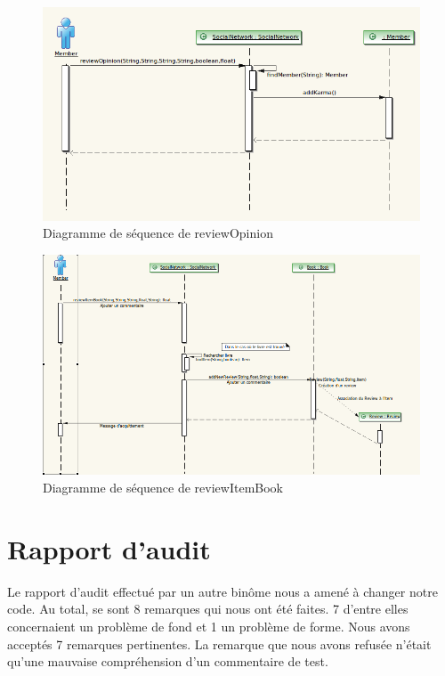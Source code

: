 \documentclass[12pt,a4paper]{report}
\begin{document}
\begin{figure}[h]
\centering
\includegraphics[angle = 90, scale=0.85]{Sequence1.png}
\caption{Diagramme de séquence de reviewOpinion}
\label{fig:diagSeq1}
\end{figure}


\begin{figure}[h]
\centering
\includegraphics[angle = 90, scale=0.85]{Sequence2.png}
\caption{Diagramme de séquence de reviewItemBook}
\label{fig:diagSeq2}
\end{figure}

\chapter*{Rapport d'audit}
\label{chapter:Rapport d'audit} %
Le rapport d'audit effectué par un autre binôme nous a amené à changer notre code. Au total, se sont 8 remarques qui nous ont été faites. 7 d'entre elles concernaient un problème de fond et 1 un problème de forme. Nous avons acceptés 7 remarques pertinentes. La remarque que nous avons refusée n'était qu'une mauvaise compréhension d'un commentaire de test. \\
\end{document}
